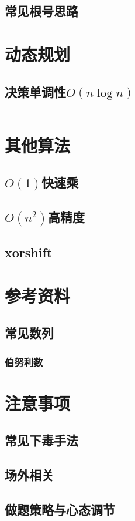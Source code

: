 \documentclass[a4paper]{article}
\begin{document}
\begin{multicols}{2}
				\subsection{常见根号思路}


			\section{动态规划}
				\subsection{决策单调性$O(n\log n)$}
					\inputminted{cpp}{../src/DP/决策单调性.cpp}

			\section{其他算法}
				\subsection{$O(1)$快速乘}
				
				\subsection{$O(n^2)$高精度}

				\subsection{xorshift}

			\section{参考资料}
				\subsection{常见数列}
					\subsubsection{伯努利数}
						

			\section{注意事项}
				\subsection{常见下毒手法}
					

				\subsection{场外相关}
					

				\subsection{做题策略与心态调节}
					

	\end{multicols}
\end{document}
